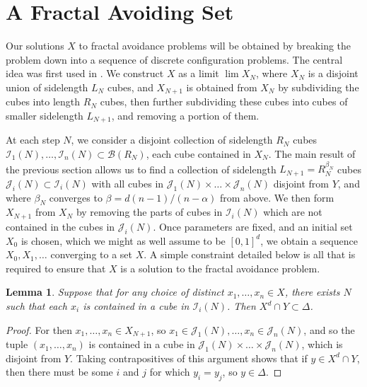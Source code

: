 \documentclass{article}
\theoremstyle{plain}
\newtheorem{lemma}{Lemma}
\theoremstyle{plain}
\begin{document}
\section{A Fractal Avoiding Set}

Our solutions $X$ to fractal avoidance problems will be obtained by breaking the problem down into a sequence of discrete configuration problems. The central idea was first used in \cite{MalabikaRob}. We construct $X$ as a limit $\lim X_N$, where $X_N$ is a disjoint union of sidelength $L_N$ cubes, and $X_{N+1}$ is obtained from $X_N$ by subdividing the cubes into length $R_N$ cubes, then further subdividing these cubes into cubes of smaller sidelength $L_{N+1}$, and removing a portion of them.

At each step $N$, we consider a disjoint collection of sidelength $R_N$ cubes $\mathcal{I}_1(N), \dots, \mathcal{I}_n(N) \subset \mathcal{B}(R_N)$, each cube contained in $X_N$. The main result of the previous section allows us to find a collection of sidelength $L_{N+1} = R_N^{\beta_N}$ cubes $\mathcal{J}_i(N) \subset \mathcal{I}_i(N)$ with all cubes in $\mathcal{J}_1(N) \times \dots \times \mathcal{J}_n(N)$ disjoint from $Y$, and where $\beta_N$ converges to $\beta = d(n-1)/(n-\alpha)$ from above. We then form $X_{N+1}$ from $X_N$ by removing the parts of cubes in $\mathcal{I}_i(N)$ which are not contained in the cubes in $\mathcal{J}_i(N)$. Once parameters are fixed, and an initial set $X_0$ is chosen, which we might as well assume to be $[0,1]^d$, we obtain a sequence $X_0, X_1, \dots$ converging to a set $X$. A simple constraint detailed below is all that is required to ensure that $X$ is a solution to the fractal avoidance problem.

\begin{lemma}
	Suppose that for any choice of distinct $x_1, \dots, x_n \in X$, there exists $N$ such that each $x_i$ is contained in a cube in $\mathcal{I}_i(N)$. Then $X^d \cap Y \subset \Delta$.
\end{lemma}
\begin{proof}
	For then $x_1, \dots, x_n \in X_{N+1}$, so $x_1 \in \mathcal{J}_1(N), \dots, x_n \in \mathcal{J}_n(N)$, and so the tuple $(x_1, \dots, x_n)$ is contained in a cube in $\mathcal{J}_1(N) \times \dots \times \mathcal{J}_n(N)$, which is disjoint from $Y$. Taking contrapositives of this argument shows that if $y \in X^d \cap Y$, then there must be some $i$ and $j$ for which $y_i = y_j$, so $y \in \Delta$.
\end{proof}
\end{document}
